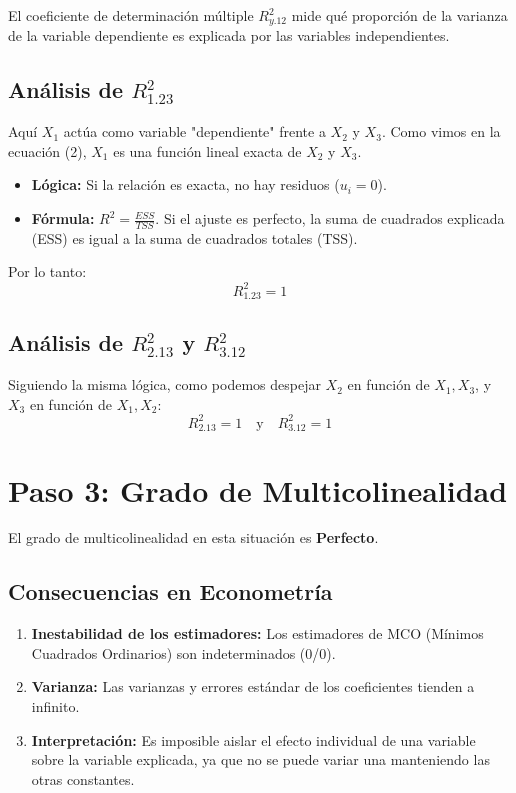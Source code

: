 \documentclass{article}
\begin{document}
El coeficiente de determinación múltiple $R^2_{y.12}$ mide qué proporción de la varianza de la variable dependiente es explicada por las variables independientes.

\subsection{Análisis de $R^2_{1.23}$}
Aquí $X_1$ actúa como variable "dependiente" frente a $X_2$ y $X_3$. Como vimos en la ecuación (2), $X_1$ es una función lineal exacta de $X_2$ y $X_3$.
\begin{itemize}
    \item \textbf{Lógica:} Si la relación es exacta, no hay residuos ($u_i = 0$).
    \item \textbf{Fórmula:} $R^2 = \frac{ESS}{TSS}$. Si el ajuste es perfecto, la suma de cuadrados explicada (ESS) es igual a la suma de cuadrados totales (TSS).
\end{itemize}

Por lo tanto:
\begin{equation}
R^2_{1.23} = 1
\end{equation}

\subsection{Análisis de $R^2_{2.13}$ y $R^2_{3.12}$}
Siguiendo la misma lógica, como podemos despejar $X_2$ en función de $X_1, X_3$, y $X_3$ en función de $X_1, X_2$:
\begin{equation}
R^2_{2.13} = 1 \quad \text{y} \quad R^2_{3.12} = 1
\end{equation}

\section{Paso 3: Grado de Multicolinealidad}
El grado de multicolinealidad en esta situación es \textbf{Perfecto}.

\subsection{Consecuencias en Econometría}
\begin{enumerate}
    \item \textbf{Inestabilidad de los estimadores:} Los estimadores de MCO (Mínimos Cuadrados Ordinarios) son indeterminados (0/0).
    \item \textbf{Varianza:} Las varianzas y errores estándar de los coeficientes tienden a infinito.
    \item \textbf{Interpretación:} Es imposible aislar el efecto individual de una variable sobre la variable explicada, ya que no se puede variar una manteniendo las otras constantes.
\end{enumerate}
\end{document}
